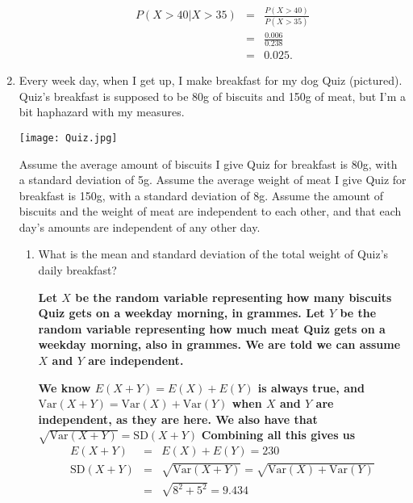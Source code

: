 \documentclass[11pt,a4paper]{article}
\begin{document}
\begin{enumerate}
\begin{enumerate}
\textbf{
\begin{eqnarray*}
P(X>40|X>35)&=&\frac{P(X>40)}{P(X>35)}\\
&=&\frac{0.006}{0.238}\\
&=&0.025.
\end{eqnarray*}
}

 

\end{enumerate}


\item Every week day, when I get up, I make breakfast for my dog Quiz (pictured). Quiz's breakfast is supposed to be 80g of biscuits and 150g of meat, but I'm a bit haphazard with my measures.

\vspace{0.15cm}

\begin{center}
\texttt{[image: Quiz.jpg]}
\end{center}

\vspace{0.15cm}

Assume the average amount of biscuits I give Quiz for breakfast is 80g, with a standard deviation of 5g. Assume the average weight of meat I give Quiz for breakfast is 150g, with a standard deviation of 8g. Assume the amount of biscuits and the weight of meat are independent to each other, and that each day's amounts are independent of any other day.

\begin{enumerate} 
\item What is the mean and standard deviation of the total weight of Quiz's daily breakfast?

\textbf{Let $X$ be the random variable representing how many biscuits Quiz gets on a weekday morning, in grammes. Let $Y$ be the random variable representing how much meat Quiz gets on a weekday morning, also in grammes. We are told we can assume $X$ and $Y$ are independent.}

\textbf{We know $E(X+Y)=E(X)+E(Y)$ is always true, and $\textrm{Var}(X+Y)=\textrm{Var}(X)+\textrm{Var}(Y)$ when $X$ and $Y$ are independent, as they are here. We also have that $\sqrt{\textrm{Var}(X+Y)}=\textrm{SD}(X+Y)$}
\textbf{Combining all this gives us}
\textbf{
\begin{eqnarray*}
E(X+Y)&=&E(X)+E(Y)=230\\
\textrm{SD}(X+Y)&=&\sqrt{\textrm{Var}(X+Y)}=\sqrt{\textrm{Var}(X)+\textrm{Var}(Y)}\\ &=&\sqrt{8^2+5^2}=9.434
\end{eqnarray*}
}




\end{enumerate}
\end{enumerate}
\end{document}
